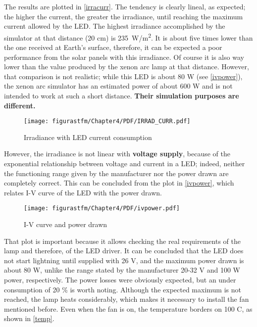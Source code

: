 The results are plotted in \autoref{irracurr}. The tendency is clearly lineal, as expected; the higher the current, the greater the irradiance, until reaching the maximum current allowed by the \acrshort{LED}. The highest irradiance accomplished by the simulator at that distance (20 cm) is \SI{235}{W/m^2}. It is about five times lower than the one received at Earth's surface, therefore, it can be expected a poor performance from the solar panels with this irradiance. Of course it is also way lower than the value produced by the xenon arc lamp at that distance. However, that comparison is not realistic; while this \acrshort{LED} is about 80 W (see \autoref{ivpower}), the xenon arc simulator has an estimated power of about 600 W and is not intended to work at such a short distance. \textbf{Their simulation purposes are different.}

\begin{figure} [H]
			\centering
			\texttt{[image: figurastfm/Chapter4/PDF/IRRAD\_CURR.pdf]}
			\caption{Irradiance with \acrshort{LED} current consumption} \label{irracurr}
						\vspace{-0.7cm}
\end{figure}

 However, the irradiance is not linear with \textbf{voltage supply}, because of the exponential relationship between voltage and current in a \acrshort{LED}; indeed, neither the functioning range given by the manufacturer nor the power drawn are completely correct. This can be concluded from the plot in \autoref{ivpower}, which relates I-V curve of the \acrshort{LED} with the power drawn. 

\begin{figure} [H]
			\centering
			\texttt{[image: figurastfm/Chapter4/PDF/ivpower.pdf]}
			\caption{I-V curve and power drawn} \label{ivpower}
			\vspace{-2cm}
\end{figure}

That plot is important because it allows checking the real requirements of the lamp and therefore, of the \acrshort{LED} driver. It can be concluded that the \acrshort{LED} does not start lightning until supplied with 26 V, and the maximum power drawn is about 80 W, unlike the range stated by the manufacturer 20-32 V and 100 W power, respectively. The power losses were obviously expected, but an under consumption of 20 \% is worth noting. Although the expected maximum is not reached, the lamp heats considerably, which makes it necessary to install the fan mentioned before. Even when the fan is on, the temperature borders on 100 \textdegree C, as shown in \autoref{temp}.


